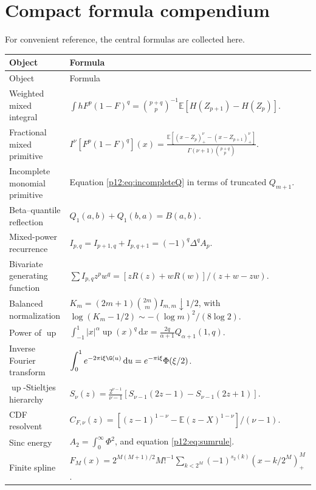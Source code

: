 \documentclass[11pt,oneside]{article}
\theoremstyle{definition}
\theoremstyle{remark}
\newcommand{\F}{F}
\newcommand{\Up}{\operatorname{up}}
\newcommand{\E}{\mathbb E}
\newcommand{\dd}{\,\mathrm d}
\newcommand{\ii}{\mathrm i}
\newcommand{\1}{\mathbf 1}
\begin{document}
\section{Compact formula compendium}

For convenient reference, the central formulas are collected here.

\begin{longtable}{@{}>{\raggedright\arraybackslash}p{}p{}@{}}
\toprule
Object & Formula \\
\midrule
\endfirsthead
\toprule
Object & Formula \\
\midrule
\endhead
Weighted mixed integral &
\(\displaystyle
\int h\F^p(1-\F)^q
=\binom{p+q}{p}^{-1}\E[H(Z_{p+1})-H(Z_p)]\).\\[0.75em]
Fractional mixed primitive &
\(\displaystyle
I^\nu[\F^p(1-\F)^q](x)
=\frac{\E[(x-Z_p)_+^\nu-(x-Z_{p+1})_+^\nu]}
{\Gamma(\nu+1)\binom{p+q}{p}}\).\\[0.75em]
Incomplete monomial primitive &
Equation \eqref{p12:eq:incompleteQ} in terms of truncated \(Q_{m+1}\).\\[0.5em]
Beta--quantile reflection &
\(Q_1(a,b)+Q_1(b,a)=B(a,b)\).\\[0.5em]
Mixed-power recurrence &
\(I_{p,q}=I_{p+1,q}+I_{p,q+1}=(-1)^q\Delta^qA_p\).\\[0.5em]
Bivariate generating function &
\(\displaystyle\sum I_{p,q}z^pw^q=[zR(z)+wR(w)]/(z+w-zw)\).\\[0.75em]
Balanced normalization &
\(K_m=(2m+1)\binom{2m}{m}I_{m,m}\downarrow1/2\), with
\(\log(K_m-1/2)\sim-(\log m)^2/(8\log2)\).\\[0.75em]
Power of \(\Up\) &
\(\displaystyle\int_{-1}^1|x|^\alpha\Up(x)^q\dd x
=\frac{2q}{\alpha+1}Q_{\alpha+1}(1,q)\).\\[0.75em]
Inverse Fourier transform &
\(\displaystyle\int_0^1e^{-2\pi\ii\xi\G(u)}\dd u
=e^{-\pi\ii\xi}\Phi(\xi/2)\).\\[0.75em]
\(\Up\)-Stieltjes hierarchy &
\(\displaystyle S_\nu(z)=\frac{2^{\nu-1}}{\nu-1}
[S_{\nu-1}(2z-1)-S_{\nu-1}(2z+1)]\).\\[0.75em]
CDF resolvent &
\(\displaystyle C_{F,\nu}(z)=
[(z-1)^{1-\nu}-\E(z-X)^{1-\nu}]/(\nu-1)\).\\[0.75em]
Sinc energy &
\(\displaystyle A_2=\int_0^\infty\Phi^2\), and equation
\eqref{p12:eq:sumrule}.\\[0.5em]
Finite spline &
\(\displaystyle\F_M(x)=2^{M(M+1)/2}M!^{-1}
\sum_{k<2^M}(-1)^{s_2(k)}(x-k/2^M)_+^M\).\\
\bottomrule
\end{longtable}
\end{document}
